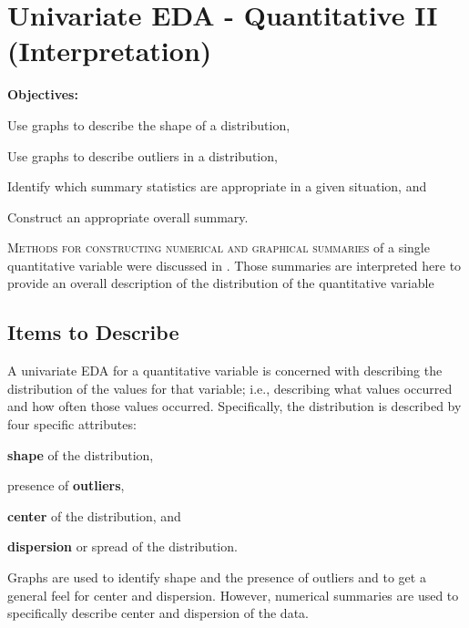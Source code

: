 

\chapter[Quant UnivEDA Interp]{Univariate EDA - Quantitative II (Interpretation)} \label{chap:UnivEDAQuant2}
\begin{ChapObj}{\boxwidth}
  \textbf{Objectives:}
  \begin{Enumerate}
    \item Use graphs to describe the shape of a distribution,
    \item Use graphs to describe outliers in a distribution,
    \item Identify which summary statistics are appropriate in a given situation, and
    \item Construct an appropriate overall summary.
  \end{Enumerate}
\end{ChapObj}

\minitoc
\newpage

\lettrine{M}{ethods for constructing numerical and graphical summaries} of a single quantitative variable were discussed in . Those summaries are interpreted here to provide an overall description of the distribution of the quantitative variable

\section{Items to Describe}
A univariate EDA for a quantitative variable is concerned with describing the distribution of the values for that variable; i.e., describing what values occurred and how often those values occurred.  Specifically, the distribution is described by four specific attributes:

\vspace{-12pt}
\begin{Enumerate}
  \item \textbf{shape} of the distribution,
  \item presence of \textbf{outliers},
  \item \textbf{center} of the distribution, and
  \item \textbf{dispersion} or spread of the distribution.
\end{Enumerate}
\vspace{-8pt}

Graphs are used to identify shape and the presence of outliers and to get a general feel for center and dispersion. However, numerical summaries are used to specifically describe center and dispersion of the data.

